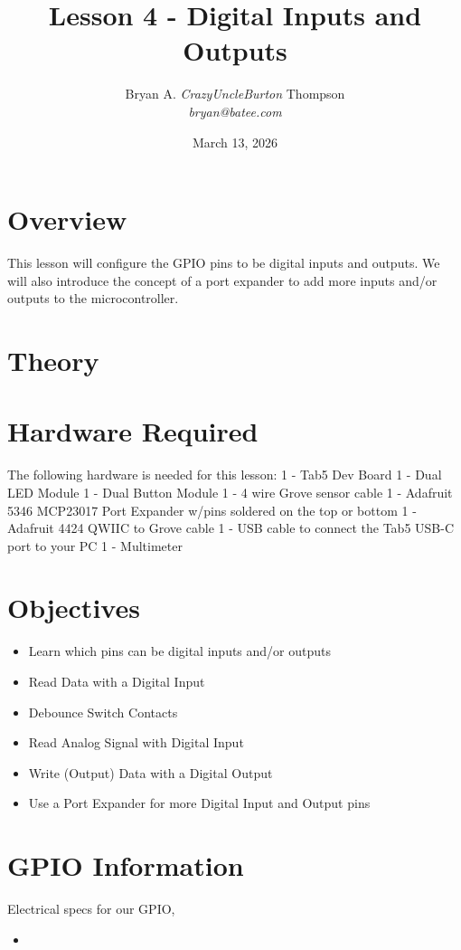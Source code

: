 \documentclass{article}
\title{Lesson 4 - Digital Inputs and Outputs}
\author{Bryan A. \textit{CrazyUncleBurton} Thompson \\ \textit{bryan@batee.com}}
\date{March 13, 2026}
\begin{document}
\maketitle

\section*{Overview}

This lesson will configure the GPIO pins to be digital inputs and outputs.  We 
will also introduce the concept of a port expander to add more inputs and/or 
outputs to the microcontroller.

\section*{Theory}


\section*{Hardware Required}

The following hardware is needed for this lesson:
1 - Tab5 Dev Board
1 - Dual LED Module
1 - Dual Button Module
1 - 4 wire Grove sensor cable
1 - Adafruit 5346 MCP23017 Port Expander w/pins soldered on the top or bottom
1 - Adafruit 4424 QWIIC to Grove cable 
1 - USB cable to connect the Tab5 USB-C port to your PC
1 - Multimeter

\vspace{3mm}


\section*{Objectives}

\begin{itemize}
  \item Learn which pins can be digital inputs and/or outputs
  \item Read Data with a Digital Input
  \item Debounce Switch Contacts
  \item Read Analog Signal with Digital Input 
  \item Write (Output) Data with a Digital Output 
  \item Use a Port Expander for more Digital Input and Output pins
\end{itemize}
\vspace{3mm}



\section*{GPIO Information}
Electrical specs for our GPIO, 
\begin{itemize}
  \item 

\end{itemize}
\vspace{3mm}
\end{document}
